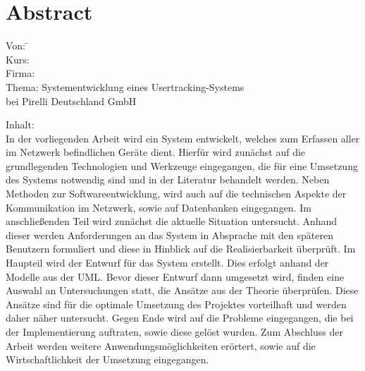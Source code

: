 \section*{Abstract}
\label{sec:Abstract}

\begin{tabbing}
Von:	 \hspace{20mm} \= \autor\\
Kurs:	  \>\kursbez\\
Firma:	  \>\firmenname\\
Thema:	  \> Systementwicklung eines Usertracking-Systems\\
		\> bei Pirelli Deutschland GmbH\\
\end{tabbing}

Inhalt:\\
In der vorliegenden Arbeit wird ein System entwickelt, welches zum Erfassen aller im Netzwerk befindlichen Geräte dient.
Hierfür wird zunächst auf die grundlegenden Technologien und Werkzeuge eingegangen, die für eine Umsetzung des Systems notwendig sind und in der Literatur behandelt werden.
Neben Methoden zur Softwareentwicklung, wird auch auf die technischen Aspekte der Kommunikation im Netzwerk, sowie auf Datenbanken eingegangen.
Im anschließenden Teil wird zunächst die aktuelle Situation untersucht. Anhand dieser werden Anforderungen an das System in Absprache mit den späteren Benutzern formuliert und diese in Hinblick auf die Realisierbarkeit überprüft.
Im Haupteil wird der Entwurf für das System erstellt. Dies erfolgt anhand der Modelle aus der UML. Bevor dieser Entwurf dann umgesetzt wird, finden eine Auswahl an Untersuchungen statt, die Ansätze aus der Theorie überprüfen. Diese Ansätze sind für die optimale Umsetzung des Projektes vorteilhaft und werden daher näher untersucht.
Gegen Ende wird auf die Probleme eingegangen, die bei der Implementierung auftraten, sowie diese gelöst wurden. 
Zum Abschluss der Arbeit werden weitere Anwendungsmöglichkeiten erörtert, sowie auf die Wirtschaftlichkeit der Umsetzung eingegangen.